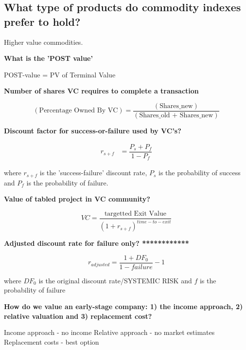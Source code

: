 \documentclass[12pt]{article}
\begin{document}
\begin{framed}
\begin{framed}
\section{What type of products do commodity indexes prefer to hold?}

Higher value commodities.

\end{framed}

\newpage

\textbf{What is the 'POST value'}

POST-value = PV of Terminal Value

\textbf{Number of shares VC requires to complete a transaction}

\begin{equation}
(\text{Percentage Owned By VC}) = \dfrac{ (\text{Shares_new})}{(\text{Shares_old + Shares_new})}
\end{equation}

\begin{framed}

\textbf{Discount factor for success-or-failure used by VC's?}

\begin{equation}
\begin{split}
r_{s+f} & = \dfrac{P_s + P_f}{1 - P_f} 
\end{split}
\end{equation}

where $r_{s+f}$ is the 'success-failure' discount rate, $P_s$ is the probability of success and $P_f$ is the probability of failure.

\textbf{Value of tabled project in VC community?}

\begin{equation}
VC = \dfrac{\text{targetted Exit Value}}{(1 + r_{s+f})^{time-to-exit}}
\end{equation}


\textbf{Adjusted discount rate for failure only? ************}

$$
r_{adjusted} = \dfrac{1 + DF_0}{1 - failure} - 1
$$

where $DF_0$ is the original discount rate/SYSTEMIC RISK and $f$ is the probability of failure

\textbf{How do we value an early-stage company: 1) the income approach, 2) relative valuation and 3) replacement cost?}

Income approach - no income
Relative approach - no market estimates
Replacement costs - best option


\end{framed}
\end{framed}
\end{document}
